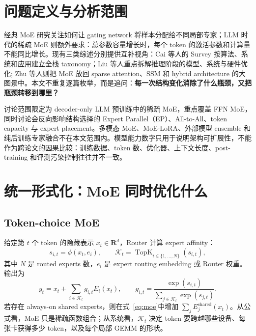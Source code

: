 \documentclass[10pt,a4paper,fontset=none]{ctexart}
\begin{document}
\section{问题定义与分析范围}

经典 MoE 研究关注如何让 gating network 将样本分配给不同局部专家；LLM 时代的稀疏 MoE 则额外要求：总参数容量增长时，每个 token 的激活参数和计算量不能同比增长。现有三类综述分别提供互补视角：Cai 等人的 Survey 按算法、系统和应用建立全栈 taxonomy\cite{cai2024survey}；Liu 等人重点拆解推理阶段的模型、系统与硬件优化\cite{liu2024inference}; Zhu 等人则把 MoE 放回 sparse attention、SSM 和 hybrid architecture 的大图景中\cite{zhu2025speed}。本文不重复逐篇枚举，而是追问：\textbf{每一次结构变化消除了什么瓶颈，又把瓶颈转移到哪里？}

讨论范围限定为 decoder-only LLM 预训练中的稀疏 MoE，重点覆盖 FFN MoE，同时讨论会反向影响结构选择的 Expert Parallel（EP）、All-to-All、token capacity 与 expert placement。多模态 MoE、MoE-LoRA、外部模型 ensemble 和纯后训练专家融合不在本文范围内。模型能力数字只用于说明架构可扩展性，不能作为跨论文的因果比较：训练数据、token 数、优化器、上下文长度、post-training 和评测污染控制往往并不一致。

\section{统一形式化：MoE 同时优化什么}

\subsection{Token-choice MoE}

给定第 $t$ 个 token 的隐藏表示 $x_t\in\mathbf{R}^{d}$，Router 计算 expert affinity：
\begin{equation}
  s_{i,t}=\phi(x_t,e_i),\qquad
  \mathcal{K}_t=\operatorname{TopK}_{i\in\{1,\ldots,N\}}(s_{i,t}),
  \label{eq:router}
\end{equation}
其中 $N$ 是 routed experts 数，$e_i$ 是 expert routing embedding 或 Router 权重。输出为
\begin{equation}
  y_t=x_t+\sum_{i\in\mathcal{K}_t}g_{i,t}E_i(x_t),
  \qquad
  g_{i,t}=\frac{\exp(s_{i,t})}{\sum_{j\in\mathcal{K}_t}\exp(s_{j,t})}.
  \label{eq:moe}
\end{equation}
若存在 always-on shared experts，则在式~\eqref{eq:moe}中增加 $\sum_j E^{\mathrm{shared}}_j(x_t)$。从公式看，MoE 只是稀疏函数组合；从系统看，$\mathcal{K}_t$ 决定 token 要跨越哪些设备、每张卡获得多少 token，以及每个局部 GEMM 的形状。
\end{document}
